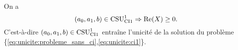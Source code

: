    \begin{prop}
      \label{prop:csu:ci1-1}
      On a 
      \begin{equation*}
        (a_0,a_1,b) \in \CSU[1]{CI1} \Rightarrow \Re(X)\ge 0. 
      \end{equation*}
      C'est-à-dire \((a_0,a_1,b) \in \CSU[1]{CI1}\) entraîne l'unicité de la solution du problème \{\eqref{eq:unicite:probleme_sans_ci},\eqref{eq:unicite:ci1}\}.
    \end{prop}
